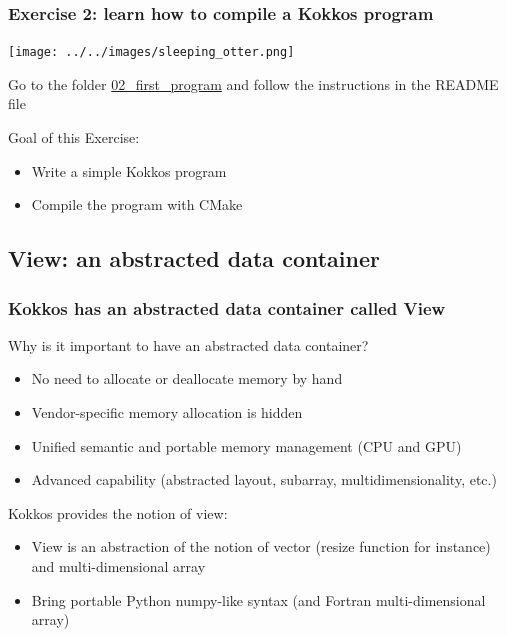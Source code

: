 \documentclass[aspectratio=169]{beamer}
\begin{document}
\begin{frame}[fragile]
    \frametitle{Exercise 2: learn how to compile a Kokkos program} 

    \begin{center}
    \texttt{[image: ../../images/sleeping\_otter.png]}
    \end{center}

    Go to the folder \href{https://github.com/CExA-project/cexa-kokkos-tutorials/tree/main/exercises/02_first_program}{02\_first\_program} and follow the instructions in the README file

    Goal of this Exercise:

    \begin{itemize}
        \item Write a simple Kokkos program
        \item Compile the program with CMake
    \end{itemize}

\end{frame}



\subsection[Data container]{View: an abstracted data container}


\begin{frame}[fragile]
    \frametitle{Kokkos has an abstracted data container called View} 

Why is it important to have an abstracted data container?

\begin{itemize}
    \item No need to allocate or deallocate memory by hand
    \item Vendor-specific memory allocation is hidden
    \item Unified semantic and portable memory management (CPU and GPU)
    \item Advanced capability (abstracted layout, subarray, multidimensionality, etc.)
\end{itemize}

Kokkos provides the notion of view:

\begin{itemize}
    \item View is an abstraction of the notion of vector (resize function for instance) and multi-dimensional array
    \item Bring portable Python numpy-like syntax (and Fortran multi-dimensional array)
\end{itemize}

\end{frame}
\end{document}
